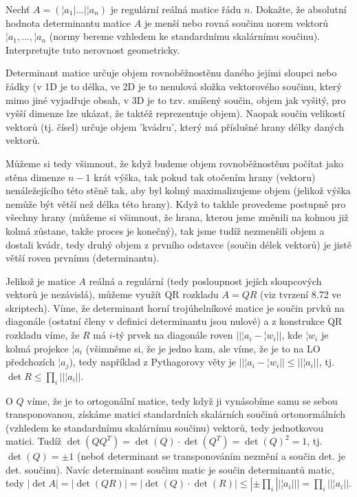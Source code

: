 \documentclass[10pt]{article}                   %
\begin{document}
\begin{priklad}[3.1]
    Nechť $A = (¦a_1 | … | ¦a_n)$ je regulární reálná matice řádu $n$. Dokažte, že absolutní hodnota determinantu matice $A$ je menší nebo rovná součinu norem vektorů $¦a_1, …, ¦a_n$ (normy bereme vzhledem ke standardnímu skalárnímu součinu). Interpretujte tuto nerovnost geometricky.

    \begin{dukazin}[Geometricky]
        Determinant matice určuje objem rovnoběžnostěnu daného jejími sloupci nebo řádky (v 1D je to délka, ve 2D je to nenulová složka vektorového součinu, který mimo jiné vyjadřuje obsah, v 3D je to tzv. smíšený součin, objem jak vyšitý, pro vyšší dimenze lze ukázat, že taktéž reprezentuje objem). Naopak součin velikostí vektorů (tj. čísel) určuje objem 'kvádru', který má příslušné hrany délky daných vektorů.

        Můžeme si tedy všimnout, že když budeme objem rovnoběžnostěnu počítat jako stěna dimenze $n-1$ krát výška, tak pokud tak otočením hrany (vektoru) nenáležejícího této stěně tak, aby byl kolmý maximalizujeme objem (jelikož výška nemůže být větší než délka této hrany). Když to takhle provedeme postupně pro všechny hrany (můžeme si všimnout, že hrana, kterou jsme změnili na kolmou již kolmá zůstane, takže proces je konečný), tak jsme tudíž nezmenšili objem a dostali kvádr, tedy druhý objem z prvního odstavce (součin délek vektorů) je jistě větší roven prvnímu (determinantu).
    \end{dukazin}

    \begin{dukazin}[QR]
        Jelikož je matice $A$ reálná a regulární (tedy posloupnost jejích sloupcových vektorů je nezávislá), můžeme využít QR rozkladu $A = QR$ (viz tvrzení 8.72 ve skriptech). Víme, že determinant horní trojúhelníkové matice je součin prvků na diagonále (ostatní členy v definici determinantu jsou nulové) a z konstrukce QR rozkladu víme, že $R$ má $i$-tý prvek na diagonále roven $||¦a_i - ¦w_i||$, kde $¦w_i$ je kolmá projekce $¦a_i$ (všimněme si, že je jedno kam, ale víme, že je to na LO předchozích $¦a_j$), tedy například z Pythagorovy věty je $||¦a_i - ¦w_i|| ≤ ||¦a_i||$, tj. $\det R ≤ \prod_i ||¦a_i||$.

        O $Q$ víme, že je to ortogonální matice, tedy když ji vynásobíme samu se sebou transponovanou, získáme matici standardních skalárních součinů ortonormálních (vzhledem ke standardnímu skalárnímu součinu) vektorů, tedy jednotkovou matici. Tudíž $\det(QQ^T) = \det(Q)·\det(Q^T) = \det(Q)^2 = 1$, tj. $\det(Q) = ±1$ (neboť determinant se transponováním nezmění a součin det. je det. součinu). Navíc determinant součinu matic je součin determinantů matic, tedy $|\det A| = |\det(QR)| = |\det(Q)·\det(R)| ≤ |±\prod_i ||¦a_i|| | = \prod_i ||¦a_i||$.
    \end{dukazin}
\end{priklad}
\end{document}
